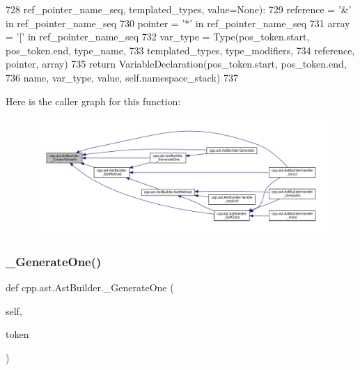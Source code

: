 \begin{DoxyCode}
728                         ref\_pointer\_name\_seq, templated\_types, value=\textcolor{keywordtype}{None}):
729         reference = \textcolor{stringliteral}{'&'} \textcolor{keywordflow}{in} ref\_pointer\_name\_seq
730         pointer = \textcolor{stringliteral}{'*'} \textcolor{keywordflow}{in} ref\_pointer\_name\_seq
731         array = \textcolor{stringliteral}{'['} \textcolor{keywordflow}{in} ref\_pointer\_name\_seq
732         var\_type = Type(pos\_token.start, pos\_token.end, type\_name,
733                         templated\_types, type\_modifiers,
734                         reference, pointer, array)
735         \textcolor{keywordflow}{return} VariableDeclaration(pos\_token.start, pos\_token.end,
736                                    name, var\_type, value, self.namespace\_stack)
737 
\end{DoxyCode}
Here is the caller graph for this function\+:
\nopagebreak
\begin{figure}[H]
\begin{center}
\leavevmode
\includegraphics[width=350pt]{classcpp_1_1ast_1_1AstBuilder_aed483f6f87068092d41c7b612553b330_icgraph}
\end{center}
\end{figure}
\mbox{\label{classcpp_1_1ast_1_1AstBuilder_ae3a006851c8f8a4b5929e5e8bcbd4618}} 
\subsubsection{\texorpdfstring{\+\_\+\+Generate\+One()}{\_GenerateOne()}}
{\footnotesize\ttfamily def cpp.\+ast.\+Ast\+Builder.\+\_\+\+Generate\+One (\begin{DoxyParamCaption}\item[{}]{self,  }\item[{}]{token }\end{DoxyParamCaption})\hspace{0.3cm}{\ttfamily [private]}}



